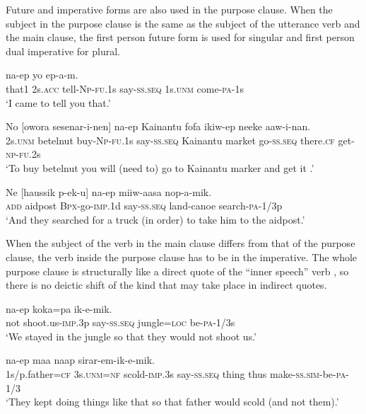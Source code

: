 Future and imperative forms are also used in the purpose clause. When the subject in the purpose clause is the same as the subject of the utterance verb and the main clause, the first person future form is used for singular and first person dual imperative for plural.

\ea%
\label{ex:8:x1614}
  na-ep  yo  ep-a-m.\\
that1 2s.\textsc{acc} tell-\textsc{Np}-\textsc{fu}.1s  say-\textsc{ss}.\textsc{seq} 1s.\textsc{unm} come-\textsc{pa}-1s\\
\glt`I came to tell you that.'
\z


\ea%
\label{ex:8:x1616}
\gll No  [owora  sesenar-i-nen]  na-ep  Kainantu  fofa ikiw-ep  neeke  aaw-i-nan.\\
2s.\textsc{unm} betelnut  buy-\textsc{Np}-\textsc{fu}.1s say-\textsc{ss}.\textsc{seq} Kainantu  market go-\textsc{ss}.\textsc{seq} there.\textsc{cf} get-\textsc{np}-\textsc{fu}.2s\\
\glt`To buy betelnut you will (need to) go to Kainantu marker and get it .'
\z


\ea%
\label{ex:8:x1620}
\gll Ne  [haussik  p-ek-u] na-ep miiw-aasa nop-a-mik.\\
\textsc{add} aidpost \textsc{Bpx}-go-\textsc{imp}.1d say-\textsc{ss}.\textsc{seq} land-canoe search-\textsc{pa}-1/3p\\
\glt`And they searched for a truck (in order) to take him to the aidpost.'
\z


When the subject of the verb in the main clause differs from that of the purpose clause, the verb inside the purpose clause has to be in the imperative. The whole purpose clause is structurally like a direct quote of the ``inner speech'' verb , so there is no deictic shift of the kind that may take place in indirect quotes.  

\ea%
\label{ex:8:x1062}
\gll [Me  yiar-uk]  na-ep  koka=pa  ik-e-mik. \\
not  shoot.us-\textsc{imp}.3p say-\textsc{ss}.\textsc{seq} jungle=\textsc{loc} be-\textsc{pa}-1/3s\\
\glt`We stayed in the jungle so that they would not shoot us.'
\z


\ea%
\label{ex:8:x346}
\gll [Auwa=ke  o=ko  amukar-inok]  na-ep  maa  naap sirar-em-ik-e-mik.\\
1s/p.father=\textsc{cf} 3s.\textsc{unm}=\textsc{nf} scold-\textsc{imp}.3s say-\textsc{ss}.\textsc{seq} thing thus make-\textsc{ss}.\textsc{sim}-be-\textsc{pa}-1/3\\
\glt`They kept doing things like that so that father would scold  (and not them).'
\z


